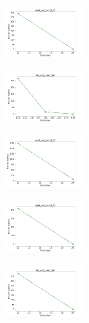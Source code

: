 \begin{figure}[H]
\begin{subfigure}
    \end{subfigure}
    \hfill
    \begin{subfigure}
        \centering
        \includegraphics[width=0.32\textwidth]{img/copkm2/rand_set_const_20_589741062_cost.png}
    \end{subfigure}
    \hfill
    \begin{subfigure}
        \centering
        \includegraphics[width=0.32\textwidth]{img/copkm2/iris_set_const_20_277451237_cost.png}
    \end{subfigure}
    \hfill
    \begin{subfigure}
        \centering
        \includegraphics[width=0.32\textwidth]{img/copkm2/ecoli_set_const_20_277451237_cost.png}
    \end{subfigure}
    \hfill
    \begin{subfigure}
        \centering
        \includegraphics[width=0.32\textwidth]{img/copkm2/rand_set_const_20_277451237_cost.png}
    \end{subfigure}
    \hfill
    \begin{subfigure}
        \centering
        \includegraphics[width=0.32\textwidth]{img/copkm2/iris_set_const_20_49258669_cost.png}

\end{subfigure}
\end{figure}
